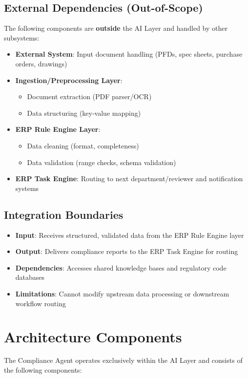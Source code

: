 \documentclass[12pt]{report}
\begin{document}
\subsection{External Dependencies (Out-of-Scope)}
The following components are \textbf{outside} the AI Layer and handled by other subsystems:
\begin{itemize}
  \item \textbf{External System}: Input document handling (PFDs, spec sheets, purchase orders, drawings)
  \item \textbf{Ingestion/Preprocessing Layer}: 
    \begin{itemize}
      \item Document extraction (PDF parser/OCR)
      \item Data structuring (key-value mapping)
    \end{itemize}
  \item \textbf{ERP Rule Engine Layer}:
    \begin{itemize}
      \item Data cleaning (format, completeness)
      \item Data validation (range checks, schema validation)
    \end{itemize}
  \item \textbf{ERP Task Engine}: Routing to next department/reviewer and notification systems
\end{itemize}

\subsection{Integration Boundaries}
\begin{itemize}
  \item \textbf{Input}: Receives structured, validated data from the ERP Rule Engine layer
  \item \textbf{Output}: Delivers compliance reports to the ERP Task Engine for routing
  \item \textbf{Dependencies}: Accesses shared knowledge bases and regulatory code databases
  \item \textbf{Limitations}: Cannot modify upstream data processing or downstream workflow routing
\end{itemize}

\section{Architecture Components}
The Compliance Agent operates exclusively within the AI Layer and consists of the following components:
\end{document}
